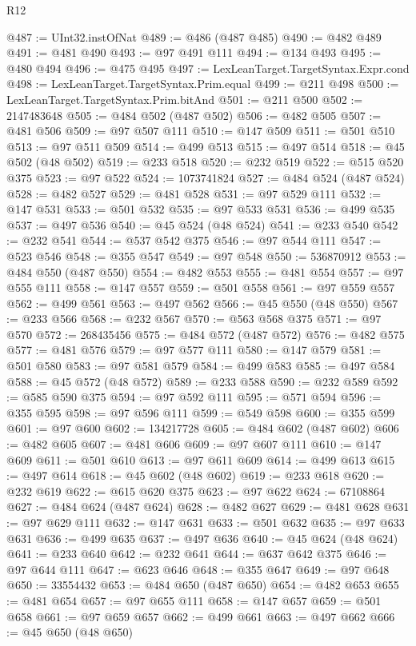 \begin{lexlean}{R12}
\begin{coremodule}
{{{{{{{{{{{{{{{{{{{{{{{{{{{{{{{{{{{{{{{{{{{{{{{{{{{{{{{{{{{{{{{{{{{{{{{{{{{{{{{{{{@487 := UInt32.instOfNat
@489 := @486 (@487 @485)
@490 := @482 @489
@491 := @481 @490
@493 := @97 @491 @111
@494 := @134 @493
@495 := @480 @494
@496 := @475 @495
@497 := LexLeanTarget.TargetSyntax.Expr.cond
@498 := LexLeanTarget.TargetSyntax.Prim.equal
@499 := @211 @498
@500 := LexLeanTarget.TargetSyntax.Prim.bitAnd
@501 := @211 @500
@502 := 2147483648
@505 := @484 @502 (@487 @502)
@506 := @482 @505
@507 := @481 @506
@509 := @97 @507 @111
@510 := @147 @509
@511 := @501 @510
@513 := @97 @511 @509
@514 := @499 @513
@515 := @497 @514
@518 := @45 @502 (@48 @502)
@519 := @233 @518
@520 := @232 @519
@522 := @515 @520 @375
@523 := @97 @522
@524 := 1073741824
@527 := @484 @524 (@487 @524)
@528 := @482 @527
@529 := @481 @528
@531 := @97 @529 @111
@532 := @147 @531
@533 := @501 @532
@535 := @97 @533 @531
@536 := @499 @535
@537 := @497 @536
@540 := @45 @524 (@48 @524)
@541 := @233 @540
@542 := @232 @541
@544 := @537 @542 @375
@546 := @97 @544 @111
@547 := @523 @546
@548 := @355 @547
@549 := @97 @548
@550 := 536870912
@553 := @484 @550 (@487 @550)
@554 := @482 @553
@555 := @481 @554
@557 := @97 @555 @111
@558 := @147 @557
@559 := @501 @558
@561 := @97 @559 @557
@562 := @499 @561
@563 := @497 @562
@566 := @45 @550 (@48 @550)
@567 := @233 @566
@568 := @232 @567
@570 := @563 @568 @375
@571 := @97 @570
@572 := 268435456
@575 := @484 @572 (@487 @572)
@576 := @482 @575
@577 := @481 @576
@579 := @97 @577 @111
@580 := @147 @579
@581 := @501 @580
@583 := @97 @581 @579
@584 := @499 @583
@585 := @497 @584
@588 := @45 @572 (@48 @572)
@589 := @233 @588
@590 := @232 @589
@592 := @585 @590 @375
@594 := @97 @592 @111
@595 := @571 @594
@596 := @355 @595
@598 := @97 @596 @111
@599 := @549 @598
@600 := @355 @599
@601 := @97 @600
@602 := 134217728
@605 := @484 @602 (@487 @602)
@606 := @482 @605
@607 := @481 @606
@609 := @97 @607 @111
@610 := @147 @609
@611 := @501 @610
@613 := @97 @611 @609
@614 := @499 @613
@615 := @497 @614
@618 := @45 @602 (@48 @602)
@619 := @233 @618
@620 := @232 @619
@622 := @615 @620 @375
@623 := @97 @622
@624 := 67108864
@627 := @484 @624 (@487 @624)
@628 := @482 @627
@629 := @481 @628
@631 := @97 @629 @111
@632 := @147 @631
@633 := @501 @632
@635 := @97 @633 @631
@636 := @499 @635
@637 := @497 @636
@640 := @45 @624 (@48 @624)
@641 := @233 @640
@642 := @232 @641
@644 := @637 @642 @375
@646 := @97 @644 @111
@647 := @623 @646
@648 := @355 @647
@649 := @97 @648
@650 := 33554432
@653 := @484 @650 (@487 @650)
@654 := @482 @653
@655 := @481 @654
@657 := @97 @655 @111
@658 := @147 @657
@659 := @501 @658
@661 := @97 @659 @657
@662 := @499 @661
@663 := @497 @662
@666 := @45 @650 (@48 @650)
}}}}}}}}}}}}}}}}}}}}}}}}}}}}}}}}}}}}}}}}}}}}}}}}}}}}}}}}}}}}}}}}}}}}}}}}}}}}}}}}}}
\end{coremodule}
\end{lexlean}
